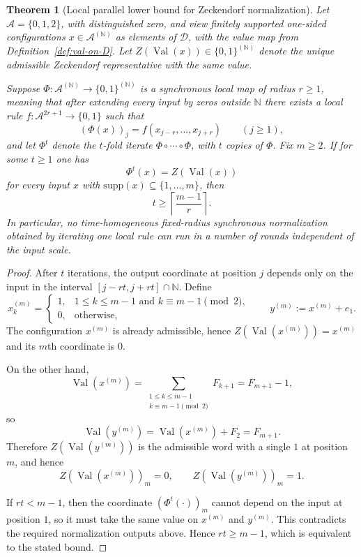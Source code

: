 \documentclass[11pt,letterpaper]{article}
\numberwithin{equation}{section}
\theoremstyle{plain}
\newtheorem{theorem}{Theorem}[section]
\theoremstyle{definition}
\theoremstyle{remark}
\newcommand{\A}{\mathcal{A}}
\newcommand{\D}{\mathcal{D}}
\newcommand{\NN}{\mathbb{N}}
\newcommand{\supp}{\mathrm{supp}}
\newcommand{\leanverified}[1]{}
\DeclareMathOperator{\Val}{Val}
\begin{document}
\begin{theorem}[Local parallel lower bound for Zeckendorf normalization]\label{thm:zeckendorf-parallel-propagation-lower-bound}
Let $\A=\{0,1,2\}$, with distinguished zero, and view finitely supported
one-sided configurations $x\in\A^{(\NN)}$ as elements of $\D$, with the value
map from Definition~\ref{def:val-on-D}.
Let $Z(\Val(x))\in\{0,1\}^{(\NN)}$ denote the unique admissible Zeckendorf
representative with the same value.

Suppose $\Phi:\A^{(\NN)}\to\{0,1\}^{(\NN)}$ is a synchronous local map of
radius $r\ge1$, meaning that after extending every input by zeros outside $\NN$
there exists a local rule $f:\A^{2r+1}\to\{0,1\}$ such that
\[
(\Phi(x))_j=f(x_{j-r},\dots,x_{j+r})
\qquad (j\ge 1),
\]
and let $\Phi^t$ denote the $t$-fold iterate
$\Phi\circ\cdots\circ\Phi$, with $t$ copies of $\Phi$.  Fix $m\ge2$.  If for
some $t\ge 1$ one has
\[
\Phi^t(x)=Z(\Val(x))
\]
for every input $x$ with $\supp(x)\subseteq\{1,\ldots,m\}$, then
\[
t\ge \left\lceil \frac{m-1}{r}\right\rceil.
\]
In particular, no time-homogeneous fixed-radius synchronous normalization
obtained by iterating one local rule can run in a number of rounds independent
of the input scale.
\leanverified{paper_zeckendorf_parallel_propagation_lower_bound}
\end{theorem}

\begin{proof}
After $t$ iterations, the output coordinate at position $j$ depends only on
the input in the interval $[j-rt,j+rt]\cap\NN$.
Define
\[
x^{(m)}_k=
\begin{cases}
1,&1\le k\le m-1\text{ and }k\equiv m-1\pmod 2,\\
0,&\text{otherwise},
\end{cases}
\qquad
y^{(m)}:=x^{(m)}+e_1.
\]
The configuration $x^{(m)}$ is already admissible, hence
$Z(\Val(x^{(m)}))=x^{(m)}$ and its $m$th coordinate is $0$.

On the other hand,
\[
\Val(x^{(m)})
=
\sum_{\substack{1\le k\le m-1\\k\equiv m-1\pmod 2}}F_{k+1}
=
F_{m+1}-1,
\]
so
\[
\Val(y^{(m)})=\Val(x^{(m)})+F_2=F_{m+1}.
\]
Therefore $Z(\Val(y^{(m)}))$ is the admissible word with a single $1$ at
position $m$, and hence
\[
Z(\Val(x^{(m)}))_m=0,
\qquad
Z(\Val(y^{(m)}))_m=1.
\]

If $rt<m-1$, then the coordinate $(\Phi^t(\cdot))_m$ cannot depend on the input
at position $1$, so it must take the same value on $x^{(m)}$ and $y^{(m)}$.
This contradicts the required normalization outputs above.  Hence
$rt\ge m-1$, which is equivalent to the stated bound.
\end{proof}
\end{document}
